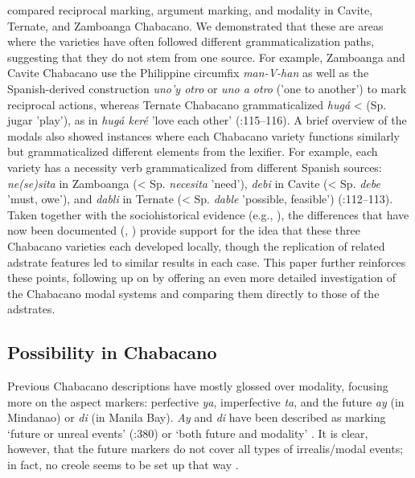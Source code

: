 \citet{SippolaLesho2020} compared reciprocal marking, argument marking, and modality in Cavite, Ternate, and Zamboanga Chabacano. We demonstrated that these are areas where the varieties have often followed different grammaticalization paths, suggesting that they do not stem from one source. For example, Zamboanga and Cavite Chabacano use the Philippine circumfix \textit{man-V-han} as well as the Spanish-derived construction \textit{uno'y otro} or \textit{uno a otro} ('one to another') to mark reciprocal actions, whereas Ternate Chabacano grammaticalized \textit{hugá} < (Sp. jugar 'play'), as in \textit{hugá keré} 'love each other' (\citealt{SippolaLesho2020}:115–116). A brief overview of the modals also showed instances where each Chabacano variety functions similarly but grammaticalized different elements from the lexifier. For example, each variety has a necessity verb grammaticalized from different Spanish sources: \textit{ne(se)sita} in Zamboanga (< Sp. \textit{necesita} 'need'), \textit{debi} in Cavite (< Sp. \textit{debe} 'must, owe'), and \textit{dabli} in Ternate (< Sp. \textit{dable} 'possible, feasible') (\citealt{SippolaLesho2020}:112–113). Taken together with the sociohistorical evidence (e.g., \citealt{FernándezSippola2017}), the differences that have now been documented (\citealt{LeshoSippola2014}, \citealt{SippolaLesho2020}) provide support for the idea that these three Chabacano varieties each developed locally, though the replication of related adstrate features led to similar results in each case. This paper further reinforces these points, following up on \citet{SippolaLesho2020} by offering an even more detailed investigation of the Chabacano modal systems and comparing them directly to those of the adstrates.

\subsection{Possibility in Chabacano}

Previous Chabacano descriptions have mostly glossed over modality, focusing more on the aspect markers: perfective \textit{ya}, imperfective \textit{ta}, and the future \textit{ay} (in Mindanao) or \textit{di} (in Manila Bay). \textit{Ay} and \textit{di} have been described as marking ‘future or unreal events’ (\citealt{LipskiSantoro2007}:380) or ‘both future and modality’ \citep[58]{Lorenzino2000}. It is clear, however, that the future markers do not cover all types of irrealis/modal events; in fact, no creole seems to be set up that way \citep{Winford2018}. 

